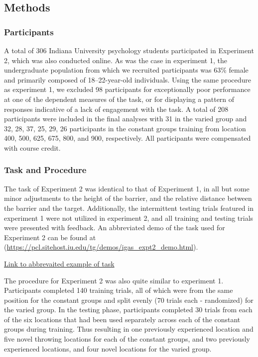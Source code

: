 \documentclass[
  jou, donotrepeattitle,floatsintext]{apa7}
\begin{document}
\hypertarget{methods-1}{%
\subsection{Methods}\label{methods-1}}

\hypertarget{participants-1}{%
\subsubsection{Participants}\label{participants-1}}

A total of 306 Indiana University psychology students participated in Experiment 2, which was also conducted online. As was the case in experiment 1, the undergraduate population from which we recruited participants was 63\% female and primarily composed of 18--22-year-old individuals. Using the same procedure as experiment 1, we excluded 98 participants for exceptionally poor performance at one of the dependent measures of the task, or for displaying a pattern of responses indicative of a lack of engagement with the task. A total of 208 participants were included in the final analyses with 31 in the varied group and 32, 28, 37, 25, 29, 26 participants in the constant groups training from location 400, 500, 625, 675, 800, and 900, respectively. All participants were compensated with course credit.

\hypertarget{task-and-procedure}{%
\subsubsection{Task and Procedure}\label{task-and-procedure}}

The task of Experiment 2 was identical to that of Experiment 1, in all but some minor adjustments to the height of the barrier, and the relative distance between the barrier and the target. Additionally, the intermittent testing trials featured in experiment 1 were not utilized in experiment 2, and all training and testing trials were presented with feedback. An abbreviated demo of the task used for Experiment 2 can be found at (\url{https://pcl.sitehost.iu.edu/tg/demos/igas_expt2_demo.html}).

\href{https://pcl.sitehost.iu.edu/tg/demos/igas_expt2_demo.html}{Link to abbrevaited example of task}

The procedure for Experiment 2 was also quite similar to experiment 1. Participants completed 140 training trials, all of which were from the same position for the constant groups and split evenly (70 trials each - randomized) for the varied group. In the testing phase, participants completed 30 trials from each of the six locations that had been used separately across each of the constant groups during training. Thus resulting in one previously experienced location and five novel throwing locations for each of the constant groups, and two previously experienced locations, and four novel locations for the varied group.
\end{document}
